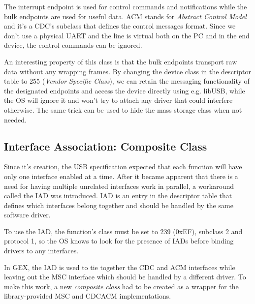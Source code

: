 The interrupt endpoint is used for control commands and notifications while the bulk endpoints are used for useful data. \gls{ACM} stands for \textit{Abstract Control Model} and it's a \gls{CDC}'s subclass that defines the control messages format. Since we don't use a physical UART and the line is virtual both on the PC and in the end device, the control commands can be ignored.

An interesting property of this class is that the bulk endpoints transport raw data without any wrapping frames. By changing the device class in the descriptor table to 255 (\textit{Vendor Specific Class}), we can retain the messaging functionality of the designated endpoints and access the device directly using e.g. libUSB, while the \gls{OS} will ignore it and won't try to attach any driver that could interfere otherwise. The same trick can be used to hide the mass storage class when not needed.

\subsection{Interface Association: Composite Class}

Since it's creation, the \gls{USB} specification expected that each function will have only one interface enabled at a time. After it became apparent that there is a need for having multiple unrelated interfaces work in parallel, a workaround called the \gls{IAD} was introduced. \gls{IAD} is an entry in the descriptor table that defines which interfaces belong together and should be handled by the same software driver.

To use the \gls{IAD}, the function's class must be set to 239 (0xEF), subclass 2 and protocol 1, so the \gls{OS} knows to look for the presence of \glspl{IAD} before binding drivers to any interfaces.


In GEX, the \gls{IAD} is used to tie together the \gls{CDC} and \gls{ACM} interfaces while leaving out the \gls{MSC} interface which should be handled by a different driver. To make this work, a new \textit{composite class} had to be created as a wrapper for the library-provided \gls{MSC} and \gls{CDCACM} implementations.





